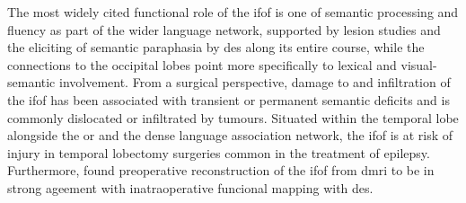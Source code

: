 The most widely cited functional role of the \gls{ifof} is one of semantic processing and fluency as part of the wider language network, supported by lesion studies\autocite{Ille2018b,Almairac2015} and the eliciting of semantic paraphasia by \gls{des} along its entire course,\autocite{Duffau2013a,Herbet2017,Voets2017} while the connections to the occipital lobes point more specifically to lexical and visual-semantic involvement.
\autocite{Martino2010,Rollans2017,Rollans2018}
From a surgical perspective, damage to and infiltration of the \gls{ifof} has been associated with transient or permanent semantic deficits and is commonly dislocated or infiltrated by tumours. \autocite{Almairac2015,Voets2017,Altieri2019,Binding2023}
Situated within the temporal lobe alongside the \gls{or} and the dense language association network, the \gls{ifof} is at risk of injury in temporal lobectomy surgeries common in the treatment of epilepsy. \autocite{Baran2020,Shah2022,Binding2023}
Furthermore, \textcite{Bello2010d} found preoperative reconstruction of the \gls{ifof} from \gls{dmri} to be in strong ageement with inatraoperative funcional mapping with \gls{des}.


